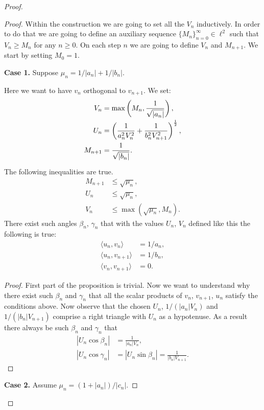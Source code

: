 \documentclass[12pt]{amsart}
\theoremstyle{case}
\begin{document}
\begin{proof}
\begin{proof}
      Within the construction we are going to set all the $V_n$ inductively.
      In order to do that we are going to define an auxiliary sequence $\{M_n\}_{n=0}^\infty \in \ell^2$ such that $V_n \geq M_n$ for any $n \geq 0$.
      On each step $n$ we are going to define $V_n$ and $M_{n+1}$.
      We start by setting $M_0 = 1$.

      \noindent\textbf{Case 1.} Suppose $\mu_n = 1/|a_n| + 1/|b_n|$.

        Here we want to have $v_n$ orthogonal to $v_{n+1}$.
        We set:
        \begin{align*}
            V_n &= \max\left(M_n, \frac{1}{\sqrt{\smash[b]{|a_n|}}}\right),\\
            U_n &= \left(\frac{1}{a_n^2 V_n^2} + \frac{1}{b_n^2 V_{n+1}^2}\right)^\frac{1}{2},\\
            M_{n+1} &= \frac{1}{\sqrt{\smash[b]{|b_n|}}}.
        \end{align*}
        \begin{prop}
          The following inequalities are true.
          \begin{align*}
            M_{n+1} &\leq \sqrt{\mu_n},\\
            U_n &\leq \sqrt{\mu_n},\\
            V_n &\leq \max(\sqrt{\mu_n}, M_n).
          \end{align*}
          There exist such angles $\beta_n$, $\gamma_n$ that with the values $U_n$, $V_n$ defined like this the following is true:
          \begin{align*}
            \langle u_n, v_n \rangle &= 1/a_n,\\
            \langle u_n, v_{n+1} \rangle &= 1/b_n,\\
            \langle v_n, v_{n+1} \rangle &= 0.
          \end{align*}
        \end{prop}
        \begin{proof}
          First part of the proposition is trivial.
          Now we want to understand why there exist such $\beta_n$ and $\gamma_n$ that all the scalar products of
          $v_n$, $v_{n+1}$, $u_n$ satisfy the conditions above.
          Now observe that the chosen $U_n$, $1/(|a_n| V_n)$ and $1/(|b_n| V_{n+1})$ 
          comprise a right triangle with $U_n$ as a hypotenuse.
          As a result there always be such $\beta_n$ and $\gamma_n$ that
          \begin{align*}
            |U_n \cos{\beta_n}| &= \frac{1}{|a_n|V_n},\\
            \left|U_n \cos{\gamma_n}\right| &= \left|U_n \sin{\beta_n}\right| = \frac{1}{|b_n|V_{n+1}}.
          \end{align*}
        \end{proof}
      \noindent\textbf{Case 2.} Assume $\mu_n = (1 + |a_n|)/|c_n|$.


\end{proof}
\end{proof}
\end{document}
